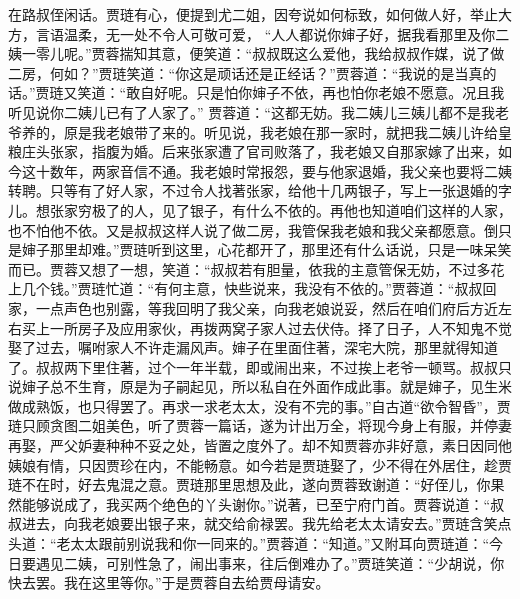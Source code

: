 \begin{parag}
    在路叔侄闲话。贾琏有心，便提到尤二姐，因夸说如何标致，如何做人好，举止大方，言语温柔，无一处不令人可敬可爱， “人人都说你婶子好，据我看那里及你二姨一零儿呢。”贾蓉揣知其意，便笑道：“叔叔既这么爱他，我给叔叔作媒，说了做二房，何如？”贾琏笑道：“你这是顽话还是正经话？”贾蓉道：“我说的是当真的话。”贾琏又笑道：“敢自好呢。只是怕你婶子不依，再也怕你老娘不愿意。况且我听见说你二姨儿已有了人家了。” 贾蓉道：“这都无妨。我二姨儿三姨儿都不是我老爷养的，原是我老娘带了来的。听见说，我老娘在那一家时，就把我二姨儿许给皇粮庄头张家，指腹为婚。后来张家遭了官司败落了，我老娘又自那家嫁了出来，如今这十数年，两家音信不通。我老娘时常报怨，要与他家退婚，我父亲也要将二姨转聘。只等有了好人家，不过令人找著张家，给他十几两银子，写上一张退婚的字儿。想张家穷极了的人，见了银子，有什么不依的。再他也知道咱们这样的人家，也不怕他不依。又是叔叔这样人说了做二房，我管保我老娘和我父亲都愿意。倒只是婶子那里却难。”贾琏听到这里，心花都开了，那里还有什么话说，只是一味呆笑而已。贾蓉又想了一想，笑道：“叔叔若有胆量，依我的主意管保无妨，不过多花上几个钱。”贾琏忙道：“有何主意，快些说来，我没有不依的。”贾蓉道：“叔叔回家，一点声色也别露，等我回明了我父亲，向我老娘说妥，然后在咱们府后方近左右买上一所房子及应用家伙，再拨两窝子家人过去伏侍。择了日子，人不知鬼不觉娶了过去，嘱咐家人不许走漏风声。婶子在里面住著，深宅大院，那里就得知道了。叔叔两下里住著，过个一年半载，即或闹出来，不过挨上老爷一顿骂。叔叔只说婶子总不生育，原是为子嗣起见，所以私自在外面作成此事。就是婶子，见生米做成熟饭，也只得罢了。再求一求老太太，没有不完的事。”自古道“欲令智昏”，贾琏只顾贪图二姐美色，听了贾蓉一篇话，遂为计出万全，将现今身上有服，并停妻再娶，严父妒妻种种不妥之处，皆置之度外了。却不知贾蓉亦非好意，素日因同他姨娘有情，只因贾珍在内，不能畅意。如今若是贾琏娶了，少不得在外居住，趁贾琏不在时，好去鬼混之意。贾琏那里思想及此，遂向贾蓉致谢道：“好侄儿，你果然能够说成了，我买两个绝色的丫头谢你。”说著，已至宁府门首。贾蓉说道：“叔叔进去，向我老娘要出银子来，就交给俞禄罢。我先给老太太请安去。”贾琏含笑点头道：“老太太跟前别说我和你一同来的。”贾蓉道：“知道。”又附耳向贾琏道：“今日要遇见二姨，可别性急了，闹出事来，往后倒难办了。”贾琏笑道：“少胡说，你快去罢。我在这里等你。”于是贾蓉自去给贾母请安。
\end{parag}


